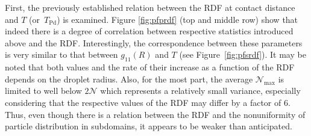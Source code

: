 \documentclass{pracamgren}
\begin{document}
First, the previously established relation between the RDF at contact distance and $T$ (or~$T_{\text{Pd}}$) is examined.
Figure \ref{fig:pfprdf} (top and middle row) show that indeed there is a degree of correlation between respective statistics introduced above and the RDF.
Interestingly, the correspondence between these parameters is very similar to that between $g_{11}(R)$ and $T$ (see Figure~\ref{fig:pfsrdf}).
It may be noted that both values and the rate of their increase as a function of the RDF depends on the droplet radius.
Also, for the most part, the average $\mathcal{N}_{\text{max}}$ is limited to well below $2 \mathcal{N}$ which represents a relatively small variance, especially considering that the respective values of the RDF may differ by a factor of $6$.
Thus, even though there is a relation between the RDF and the nonuniformity of particle distribution in subdomains, it appears to be weaker than anticipated.
\end{document}
